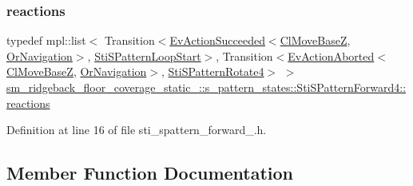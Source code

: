 \subsubsection{\texorpdfstring{reactions}{reactions}}
{\footnotesize\ttfamily typedef mpl\+::list$<$ Transition$<$\hyperlink{structsmacc_1_1default__events_1_1EvActionSucceeded}{Ev\+Action\+Succeeded}$<$\hyperlink{classcl__move__base__z_1_1ClMoveBaseZ}{Cl\+Move\+BaseZ}, \hyperlink{classsm__ridgeback__floor__coverage__static__1_1_1OrNavigation}{Or\+Navigation}$>$, \hyperlink{structsm__ridgeback__floor__coverage__static__1_1_1s__pattern__states_1_1StiSPatternLoopStart}{Sti\+S\+Pattern\+Loop\+Start}$>$, Transition$<$\hyperlink{structsmacc_1_1default__events_1_1EvActionAborted}{Ev\+Action\+Aborted}$<$\hyperlink{classcl__move__base__z_1_1ClMoveBaseZ}{Cl\+Move\+BaseZ}, \hyperlink{classsm__ridgeback__floor__coverage__static__1_1_1OrNavigation}{Or\+Navigation}$>$, \hyperlink{structsm__ridgeback__floor__coverage__static__1_1_1s__pattern__states_1_1StiSPatternRotate4}{Sti\+S\+Pattern\+Rotate4}$>$ $>$ \hyperlink{structsm__ridgeback__floor__coverage__static__1_1_1s__pattern__states_1_1StiSPatternForward4_a0646b9fcd87d4af839c1773a86c5aa00}{sm\+\_\+ridgeback\+\_\+floor\+\_\+coverage\+\_\+static\+\_\+::s\+\_\+pattern\+\_\+states\+::\+Sti\+S\+Pattern\+Forward4\+::reactions}}



Definition at line 16 of file sti\+\_\+spattern\+\_\+forward\+\_.\+h.



\subsection{Member Function Documentation}
\mbox{\label{structsm__ridgeback__floor__coverage__static__1_1_1s__pattern__states_1_1StiSPatternForward4_a816e104aa4c0257d030b4db90440ddd6}} 
